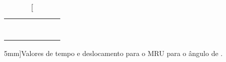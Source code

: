 \begin{table*}[!ht]
\begin{tabular}{lp{25mm}p{25mm}p{25mm}p{25mm}p{25mm}l}
	& \cellcolor[gray]{0.95} & \cellcolor[gray]{0.97} & \cellcolor[gray]{0.95} \\ 
	& \cellcolor[gray]{0.89} & \cellcolor[gray]{0.92} & \cellcolor[gray]{0.89} \\ 
	& \cellcolor[gray]{0.95} & \cellcolor[gray]{0.97} & \cellcolor[gray]{0.95} \\ 
	& \cellcolor[gray]{0.89} & \cellcolor[gray]{0.92} & \cellcolor[gray]{0.89} \\ 
	& \cellcolor[gray]{0.95} & \cellcolor[gray]{0.97} & \cellcolor[gray]{0.95} \\ 
	& \cellcolor[gray]{0.89} & \cellcolor[gray]{0.92} & \cellcolor[gray]{0.89} \\ 
	& \cellcolor[gray]{0.95} & \cellcolor[gray]{0.97} & \cellcolor[gray]{0.95} \\ 
	\cmidrule{2-4}
\bottomrule
\end{tabular}
\caption[][5mm]{Valores de tempo e deslocamento para o MRU para o ângulo de .}
\label{DadosMRU2}
\end{table*}

